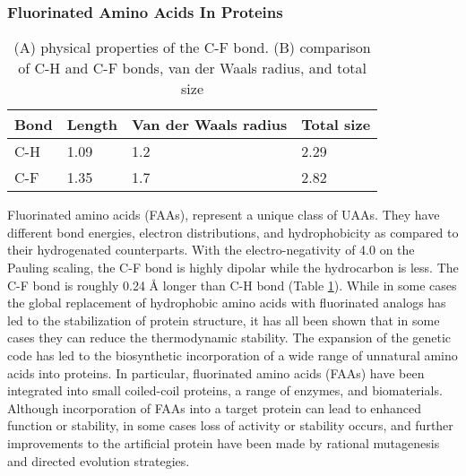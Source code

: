 \begin{refsection}
\subsubsection{Fluorinated Amino Acids In Proteins} 
\label{sec:faa-intro}

\begin{table}[h!]
\centering
\begin{tabular}{ llll }
  \hline
  Bond & Length & Van der Waals radius & Total size \\
  \hline

  C-H & 1.09 & 1.2 & 2.29 \\
  C-F & 1.35 & 1.7 & 2.82 \\

  \hline
\end{tabular}
\caption[(A) physical properties of the C-F bond. (B) comparison of C-H and C-F
bonds, van der Waals radius, and total size]{(A) physical properties of the C-F
bond. (B) comparison of C-H and C-F bonds, van der Waals radius, and total
size\cite{Tang2001,Odar2015}}
\label{tab:c-fbond}
\end{table}

Fluorinated amino acids (FAAs), represent a unique class of UAAs. They have
different bond energies, electron distributions, and
hydrophobicity\cite{Biffinger2004} as compared to their hydrogenated
counterparts. With the electro-negativity of 4.0 on the Pauling scaling, the
C-F bond is highly dipolar while the hydrocarbon is less. The C-F bond is
roughly 0.24 {\AA} longer than C-H bond (Table
\ref{tab:c-fbond})\cite{Tang2001}. While in some cases the global replacement
of hydrophobic amino acids with fluorinated analogs has led to the
stabilization of protein structure\cite{Biffinger2004}, it has all been shown
that in some cases they can reduce the thermodynamic
stability\cite{Panchenko2006b}. The expansion of the genetic code has led to
the biosynthetic incorporation of a wide range of unnatural amino acids into
proteins\cite{Voloshchuk2010}. In particular, fluorinated amino acids (FAAs)
have been integrated into small coiled-coil
proteins\cite{Montclare2009b,Tang2001}, a range of
enzymes\cite{Voloshchuk2009,Panchenko2006b,Voloshchuk2007b,Mehta2011b,Hammill2007},
and biomaterials\cite{Yuvienco2012b}. Although incorporation of FAAs into a
target protein can lead to enhanced function or stability, in some cases loss
of activity or stability occurs, and further improvements to the artificial
protein have been made by rational mutagenesis\cite{Voloshchuk2007b} and
directed evolution strategies\cite{Montclare2006b}.


\end{refsection}
